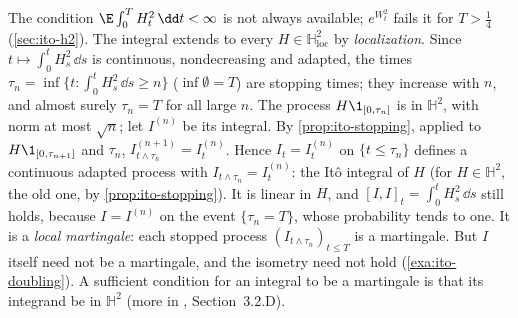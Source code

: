 \begin{remark}\label{rem:ito-local}
The condition $\E\int_0^TH_t^2\,\dd t<\infty$ is not always available; $e^{W_t^2}$ fails it
for $T>\frac14$ (\cref{sec:ito-h2}). The integral extends to every $H\in\mathbb
H^2_{\mathrm{loc}}$ by \emph{localization}. Since $t\mapsto\int_0^tH_s^2\,\dd s$ is continuous,
nondecreasing and adapted, the times $\tau_n=\inf\{t:\int_0^tH_s^2\,\dd s\ge n\}$
($\inf\emptyset=T$) are stopping times; they increase with $n$, and almost surely $\tau_n=T$ for
all large $n$. The process $H\1_{[0,\tau_n]}$ is in $\mathbb H^2$, with norm at most $\sqrt n$;
let $I^{(n)}$ be its integral. By \cref{prop:ito-stopping}, applied to $H\1_{[0,\tau_{n+1}]}$ and
$\tau_n$, $I^{(n+1)}_{t\wedge\tau_n}=I^{(n)}_t$. Hence $I_t=I^{(n)}_t$ on $\{t\le\tau_n\}$ defines a
continuous adapted process with $I_{t\wedge\tau_n}=I^{(n)}_t$: the It\^o integral of $H$ (for
$H\in\mathbb H^2$, the old one, by \cref{prop:ito-stopping}). It is linear in $H$, and
$[I,I]_t=\int_0^tH_s^2\,\dd s$ still holds, because $I=I^{(n)}$ on the event $\{\tau_n=T\}$,
whose probability tends to one. It is a \emph{local martingale}: each stopped process
$(I_{t\wedge\tau_n})_{t\le T}$ is a martingale. But $I$ itself need not be a martingale, and the
isometry need not hold (\cref{exa:ito-doubling}). A sufficient condition for an integral to be a
martingale is that its integrand be in $\mathbb H^2$ (more in \textcite{karatzas-shreve},
Section~3.2.D).
\end{remark}

